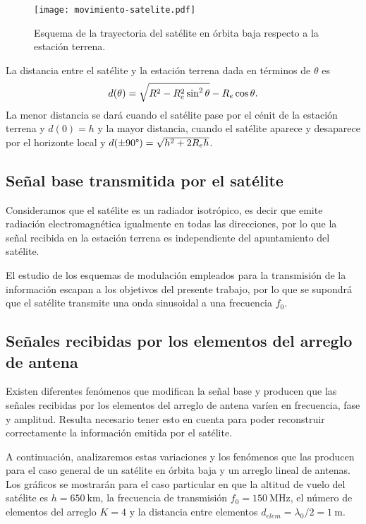 \documentclass{article}
\newenvironment{standalone}{\begin{preview}}{\end{preview}}
\begin{document}
\begin{standalone}
  \begin{figure}[!htbp]
    \centering
    \texttt{[image: movimiento-satelite.pdf]}
    \caption{Esquema de la trayectoria del satélite en órbita baja respecto a la estación terrena.}
    \label{fig:esquema_satelite_antena}
  \end{figure}

  La distancia entre el satélite y la estación terrena dada en términos de $\theta$ es \cite{popescu2016}
  \begin{equation}
    d(\theta) = \sqrt{ R^2 - R_e^2  \sin^2{\theta} } - R_e \cos{\theta}.
    \tagaddtext{[\si{\meter}]}
  \end{equation}
  La menor distancia se dará cuando el satélite pase por el cénit de la estación terrena y $d(0) = h$ y la mayor distancia, cuando el satélite aparece y desaparece por el horizonte local y $d(\pm 90 \degree) = \sqrt{ h^2 + 2 R_e h }$.

  \subsection{Señal base transmitida por el satélite}

  Consideramos que el satélite es un radiador isotrópico, es decir que emite radiación electromagnética igualmente en todas las direcciones, por lo que la señal recibida en la estación terrena es independiente del apuntamiento del satélite.

  El estudio de los esquemas de modulación empleados para la transmisión de la información escapan a los objetivos del presente trabajo, por lo que se supondrá que el satélite transmite una onda sinusoidal a una frecuencia $f_0$.

  \subsection{Señales recibidas por los elementos del arreglo de antena}

  Existen diferentes fenómenos que modifican la señal base y producen que las señales recibidas por los elementos del arreglo de antena varíen en frecuencia, fase y amplitud.
  Resulta necesario tener esto en cuenta para poder reconstruir correctamente la información emitida por el satélite.

  A continuación, analizaremos estas variaciones y los fenómenos que las producen para el caso general de un satélite en órbita baja y un arreglo lineal de antenas. Los gráficos se mostrarán para el caso particular en que la altitud de vuelo del satélite es $h = 650 \ \si{\kilo\meter}$, la frecuencia de transmisión $f_0 = 150 \ \si{\mega\hertz}$, el número de elementos del arreglo $K = 4$ y la distancia entre elementos $d_{elem} = \lambda_0 / 2 = 1 \ \si{\meter}$.


\end{standalone}
\end{document}
